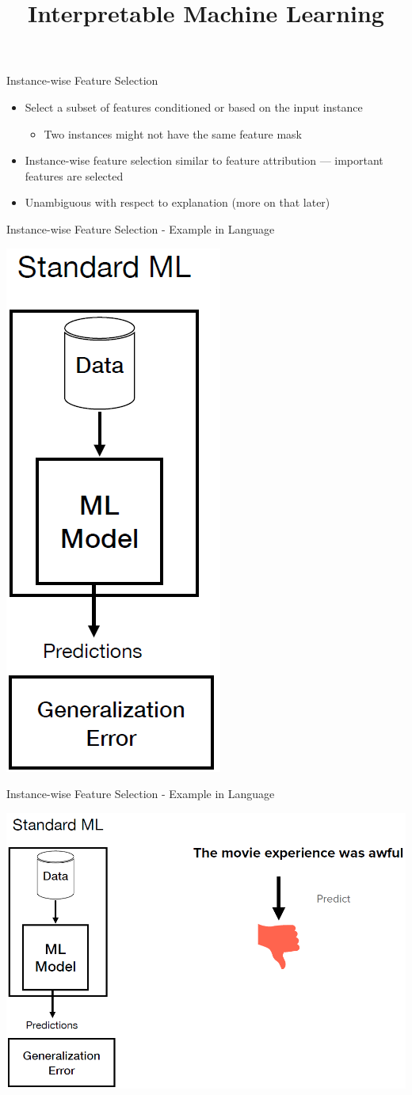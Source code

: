 \documentclass[11pt,compress,t,notes=noshow, aspectratio=169, xcolor=table]{beamer}
\title{Interpretable Machine Learning}
\date{}
\begin{document}
	\graphicspath{ {./figure/} }

\newcommand{\titlefigure}{figure/bild2}
\newcommand{\learninggoals}{
\item TBA
\item TBA
\item TBA}


 
\begin{frame}{Instance-wise Feature Selection}
\begin{itemize}
    \item Select a subset of features conditioned or based on the input instance
    \begin{itemize}
        \item Two instances might not have the same feature mask
    \end{itemize}
    \bigskip
    \item Instance-wise feature selection similar to feature attribution — important features are
selected
\item Unambiguous with respect to explanation (more on that later)
\end{itemize}
    
\end{frame}

\begin{frame}{Instance-wise Feature Selection - Example in Language}


\centerline{\includegraphics[width=0.15\linewidth,left]{bild5}}

\end{frame}

\begin{frame}{Instance-wise Feature Selection - Example in Language}

\centerline{\includegraphics[width=0.6\linewidth,left]{bild6}}

\end{frame}
\end{document}
